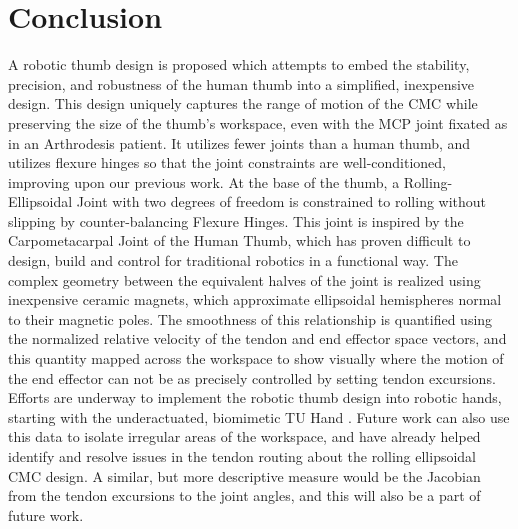 \documentclass[letterpaper, 10 pt, conference]{ieeeconf}
\begin{document}
\section{Conclusion}
A robotic thumb design is proposed which attempts to embed the stability, precision, and robustness of the human thumb into a simplified, inexpensive design. This design uniquely captures the range of motion of the CMC while preserving the size of the thumb's workspace, even with the MCP joint fixated as in an Arthrodesis patient. It utilizes fewer joints than a human thumb, and utilizes flexure hinges so that the joint constraints are well-conditioned, improving upon our previous work. At the base of the thumb, a Rolling-Ellipsoidal Joint with two degrees of freedom is constrained to rolling without slipping by counter-balancing Flexure Hinges. This joint is inspired by the Carpometacarpal Joint of the Human Thumb, which has proven difficult to design, build and control for traditional robotics in a functional way. The complex geometry between the equivalent halves of the joint is realized using inexpensive ceramic magnets, which approximate ellipsoidal hemispheres normal to their magnetic poles. The smoothness of this relationship is quantified using the normalized relative velocity of the tendon and end effector space vectors, and this quantity mapped across the workspace to show visually where the motion of the end effector can not be as precisely controlled by setting tendon excursions. Efforts are underway to implement the robotic thumb design into robotic hands, starting with the underactuated, biomimetic TU Hand \cite{das}. Future work can also use this data to isolate irregular areas of the workspace, and have already helped identify and resolve issues in the tendon routing about the rolling ellipsoidal CMC design. A similar, but more descriptive measure would be the Jacobian from the tendon excursions to the joint angles, and this will also be a part of future work.
\end{document}
